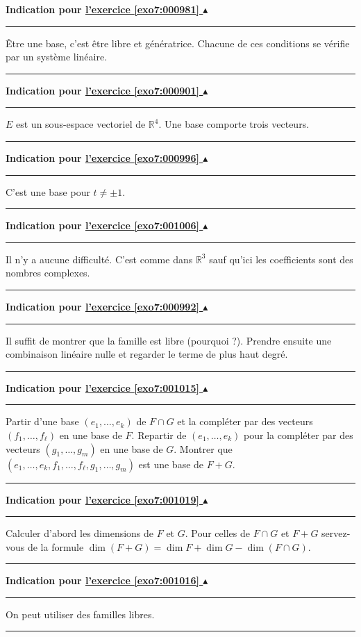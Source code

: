 \documentclass[11pt,a4paper]{article}
\newcommand{\Rr}{\mathbb{R}} \newcommand{\R}{\mathbb{R}}
\newcounter{exo}
\newcommand{\indication}[1]{\hypertarget{ind7:#1}{}\label{ind7:#1}{\bf Indication pour \hyperlink{exo7:#1}{l'exercice \ref{exo7:#1} $\blacktriangle$}}\vspace{1mm}\hrule\vspace{1mm}}
\newcommand{\finindication}{\vspace{1mm}\hrule\vspace*{7mm}}
\begin{document}
\indication{000981}
\^Etre une base, c'est être libre et génératrice.
Chacune de ces conditions se vérifie par un système linéaire.
\finindication
\indication{000901}
$E$ est un sous-espace vectoriel de $\Rr^4$. Une base comporte trois vecteurs.
\finindication
\indication{000996}
C'est une base pour $t\neq \pm 1$.
\finindication
\indication{001006}
Il n'y a aucune difficulté. C'est comme dans $\Rr^3$ sauf qu'ici les coefficients sont des nombres complexes.
\finindication
\indication{000992}
Il suffit de montrer que la famille est libre (pourquoi ?). 
Prendre ensuite une combinaison linéaire nulle et regarder le terme de plus haut degré.
\finindication
\indication{001015}
Partir d'une base $(e_1,\ldots, e_k)$ de $F\cap G$ et la compl\'eter par des vecteurs $(f_1,\ldots,f_\ell)$ en une base de $F$.
Repartir de $(e_1,\ldots, e_k)$ pour la compléter par  des vecteurs $(g_1,\ldots,g_m)$ en une base de $G$.
Montrer que $(e_1,\ldots, e_k,f_1,\ldots,f_\ell,g_1,\ldots,g_m)$ est une base de $F+G$.
\finindication
\indication{001019}
Calculer d'abord les dimensions de $F$ et $G$.
Pour celles de $F\cap G$ et $F+G$ servez-vous de la formule $\dim (F+G) = \dim F + \dim G - \dim (F\cap G)$.
\finindication
\indication{001016}
On peut utiliser des familles libres.
\finindication


\newpage
\end{document}
